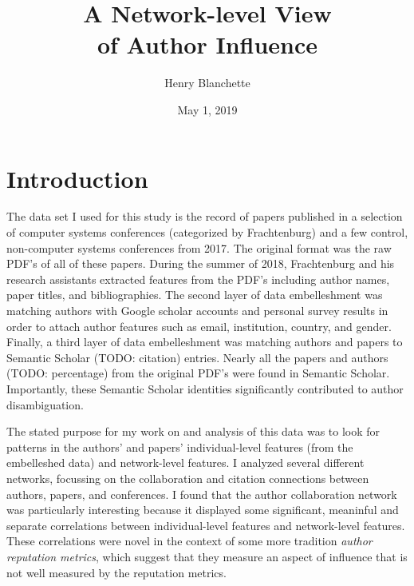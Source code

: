 \documentclass{article}
\title{\sc A Network-level View \\ of Author Influence}
\author{Henry Blanchette}
\date{May 1, 2019}
\renewcommand{\it}{\textit}
\begin{document}

\maketitle


\section{Introduction}

The data set I used for this study is the record of papers published in a selection of computer systems conferences (categorized by Frachtenburg) and a few control, non-computer systems conferences from 2017.
The original format was the raw PDF's of all of these papers.
During the summer of 2018, Frachtenburg and his research assistants extracted features from the PDF's including author names, paper titles, and bibliographies.
The second layer of data embelleshment was matching authors with Google scholar accounts and personal survey results in order to attach author features such as email, institution, country, and gender.
Finally, a third layer of data embelleshment was matching authors and papers to Semantic Scholar (TODO: citation) entries.
Nearly all the papers and authors (TODO: percentage) from the original PDF's were found in Semantic Scholar.
Importantly, these Semantic Scholar identities significantly contributed to author disambiguation.

The stated purpose for my work on and analysis of this data was to look for patterns in the authors' and papers' individual-level features (from the embelleshed data) and network-level features.
I analyzed several different networks, focussing on the collaboration and citation connections between authors, papers, and conferences.
I found that the author collaboration network was particularly interesting because it displayed some significant, meaninful and separate correlations between individual-level features and network-level features.
These correlations were novel in the context of some more tradition \it{author reputation metrics}, which suggest that they measure an aspect of influence that is not well measured by the reputation metrics.
\end{document}
